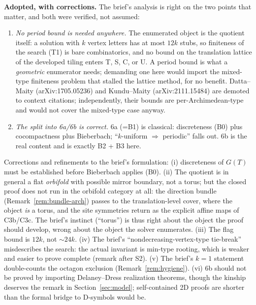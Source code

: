 \documentclass[11pt]{article}
\theoremstyle{definition}
\begin{document}
\textbf{Adopted, with corrections.} The brief's analysis is right on the two points that
matter, and both were verified, not assumed:

\begin{enumerate}
\item \emph{No period bound is needed anywhere.} The enumerated object is the quotient
itself: a solution with $k$ vertex letters has at most $12k$ stubs, so finiteness of the
search (T1) is bare combinatorics, and no bound on the translation lattice of the
developed tiling enters T, S, C, or U. A period bound is what a \emph{geometric}
enumerator needs; demanding one here would import the mixed-type finiteness problem that
stalled the lattice method, for no benefit. Datta--Maity (arXiv:1705.05236) and
Kundu--Maity (arXiv:2111.15484) are demoted to context citations; independently, their
bounds are per-Archimedean-type and would not cover the mixed-type case anyway.
\item \emph{The split into 6a/6b is correct.} 6a (=B1) is classical: discreteness (B0)
plus cocompactness plus Bieberbach; ``$k$-uniform $\Rightarrow$ periodic'' falls out.
6b is the real content and is exactly B2 + B3 here.
\end{enumerate}

Corrections and refinements to the brief's formulation:
(i) discreteness of $G(T)$ must be established before Bieberbach applies (B0).
(ii) The quotient is in general a flat \emph{orbifold} with possible mirror boundary,
not a torus; but the closed proof does not run in the orbifold category at all: the
direction bundle (Remark~\ref{rem:bundle-arch}) passes to the translation-level cover,
where the object \emph{is} a torus, and the site symmetries return as the explicit
affine maps of C3b/C3c. The brief's instinct (``torus'') is thus right about the object
the proof should develop, wrong about the object the solver enumerates.
(iii) The flag bound is $12k$, not $\sim 24k$.
(iv) The brief's ``nondecreasing-vertex-type tie-break'' misdescribes the search: the
actual invariant is min-type rooting, which is weaker and easier to prove complete
(remark after S2).
(v) The brief's $k=1$ statement double-counts the octagon exclusion
(Remark~\ref{rem:hygiene}).
(vi) 6b should not be proved by importing Delaney--Dress realization theorems, though
the kinship deserves the remark in Section~\ref{sec:model}; self-contained 2D proofs are
shorter than the formal bridge to D-symbols would be.

\end{document}
